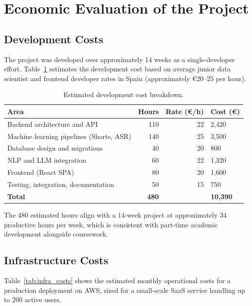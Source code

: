 \documentclass[ENG]{TFUOC}
\begin{document}
\section{Economic Evaluation of the Project}

\subsection{Development Costs}

The project was developed over approximately 14 weeks as a single-developer effort. Table~\ref{tab:dev_costs} estimates the development cost based on average junior data scientist and frontend developer rates in Spain (approximately €20–25 per hour).

\begin{table}[H]
\centering
\caption{Estimated development cost breakdown.}
\label{tab:dev_costs}
\begin{tabular}{@{}lrrl@{}}
\toprule
\textbf{Area} & \textbf{Hours} & \textbf{Rate (€/h)} & \textbf{Cost (€)} \\
\midrule
Backend architecture and API          & 110 & 22 & 2,420 \\
Machine learning pipelines (Shorts, ASR) & 140 & 25 & 3,500 \\
Database design and migrations        &  40 & 20 & 800   \\
NLP and LLM integration               &  60 & 22 & 1,320 \\
Frontend (React SPA)                  &  80 & 20 & 1,600 \\
Testing, integration, documentation  &  50 & 15 & 750   \\
\midrule
\textbf{Total}                        & \textbf{480} & & \textbf{10,390} \\
\bottomrule
\end{tabular}
\end{table}

The 480 estimated hours align with a 14-week project at approximately 34 productive hours per week, which is consistent with part-time academic development alongside coursework.

\subsection{Infrastructure Costs}

Table~\ref{tab:infra_costs} shows the estimated monthly operational costs for a production deployment on AWS, sized for a small-scale SaaS service handling up to 200 active users.
\end{document}
